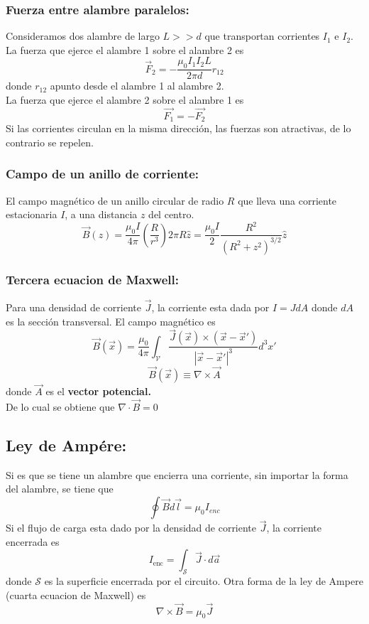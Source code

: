 \documentclass[a4paper, 10pt]{article}
\begin{document}
\begin{multicols*}{2}
	\subsubsection{Fuerza entre alambre paralelos: }Consideramos dos alambre de largo $L>>d$ que transportan corrientes $I_1$ e $I_2$. La fuerza que ejerce el alambre 1 sobre el alambre 2 es
	$$\vec{F}_2 = -\frac{\mu_0 I_1 I_2 L}{2 \pi d} r_{12}$$
	donde $r_{12}$ apunto desde el alambre 1 al alambre 2.\\
	La fuerza que ejerce el alambre 2 sobre el alambre 1 es
	$$\vec{F_1} = - \vec{F_2}$$
	Si las corrientes circulan en la misma dirección, las fuerzas son atractivas, de lo contrario se repelen.\\
	    
	\subsubsection{Campo de un anillo de corriente:} El campo magnético de un anillo circular de radio $R$ que lleva una corriente estacionaria $I$, a una distancia $z$ del centro.
	$$\vec{B}(z) = \frac{\mu_0 I}{4 \pi} \left( \frac{R}{r^3} \right) 2 \pi R \hat{z} = \frac{\mu_0 I}{2} \frac{R^2}{(R^2 + z^2)^{3/2}}\hat{z}$$
	    
	\subsubsection{Tercera ecuacion de Maxwell:} Para una densidad de corriente $\vec{J}$, la corriente esta dada por $I=JdA$ donde $dA$ es la sección transversal. El campo magnético es
	$$\vec{B}(\vec{x})=\frac{\mu_0}{4 \pi }\int_{\mathcal{V}}\frac{\vec{J}(\vec{x})\times(\vec{x}-\vec{x}')}{|\vec{x}-\vec{x}'|^3}d^3x'$$
	$$\vec{B}(\vec{x})\equiv \nabla \times \vec{A}$$
	donde $\vec{A}$ es el \textbf{vector potencial.}\\
	De lo cual se obtiene que $\nabla \cdot \vec{B}=0$
	    
	\subsection{Ley de Ampére:} Si es que se tiene un alambre que encierra una corriente, sin importar la forma del alambre, se tiene que
	$$\oint \vec{B} d\vec{l} = \mu_0 I_{enc}$$
	Si el flujo de carga esta dado por la densidad de corriente $\vec{J}$, la corriente encerrada es
	$$I_{\text{enc}}=\int_{\mathcal{S}} \vec{J}\cdot d\vec{a}$$
	donde $\mathcal{S}$ es la superficie encerrada por el circuito. Otra forma de la ley de Ampere (cuarta ecuacion de Maxwell) es
	$$\nabla \times \vec{B}=\mu_0\vec{J}$$


\end{multicols*}
\end{document}
